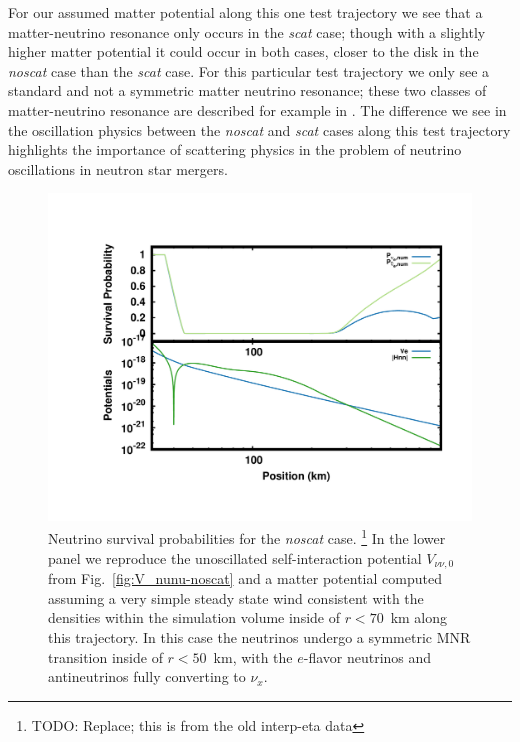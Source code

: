 \documentclass[aps,floatfix,prd,superscriptaddress,twocolumn]{revtex4-1}
\begin{document}
For our assumed matter potential along this one test trajectory
we see that a matter-neutrino resonance only occurs in the \emph{scat} case;
though with a slightly higher matter potential it could occur in both cases,
closer to the disk in the \emph{noscat} case than the \emph{scat} case.
For this particular test trajectory we only see a standard and not a symmetric
matter neutrino resonance;
these two classes of matter-neutrino resonance
are described for example in \cite{malk2016-mnr_3,vaan2016-uncovering_mnr}.
The difference we see in the oscillation physics between the \emph{noscat}
and \emph{scat} cases along this test trajectory highlights the importance of
scattering physics in the problem of neutrino oscillations in
neutron star mergers.

\begin{figure}
  \includegraphics[width=\columnwidth]{fig-survival_prob-noscat_nh}
  \caption{Neutrino survival probabilities for the \emph{noscat} case.
    \footnote{TODO: Replace; this is from the old interp-eta data}
    In the lower panel we reproduce the unoscillated self-interaction potential
    $V_{\nu\nu,0}$ from Fig.~\ref{fig:V_nunu-noscat} and a matter potential
    computed assuming a very simple steady state wind consistent with the
    densities within the simulation volume inside of $r<70$~km
    along this trajectory.
    In this case the neutrinos undergo a symmetric MNR transition
    inside of $r<50$~km,
    with the $e$-flavor neutrinos and antineutrinos fully converting to $\nu_x$.
  }
  \label{fig:survival-noscat}
\end{figure}
\end{document}

